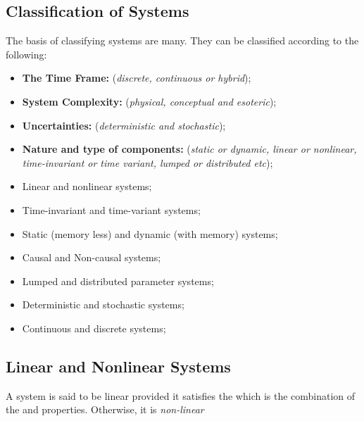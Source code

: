 \documentclass[../notes-main.tex]{subfiles}
\begin{document}
\subsection{Classification of Systems}
The basis of classifying systems are many. They can be classified according to the following:
\begin{mdframed}
    \begin{itemize}
        \item[\bluetext{a.}] \textbf{The Time Frame:} (\emph{discrete, continuous or hybrid});
        \item[\bluetext{b.}] \textbf{System Complexity:} (\emph{physical, conceptual and esoteric});
        \item[\bluetext{c.}] \textbf{Uncertainties:} (\emph{deterministic and stochastic});
        \item[\bluetext{d.}] \textbf{Nature and type of components:} (\emph{static or dynamic, linear or nonlinear, time-invariant or time variant, lumped or distributed etc});
    \end{itemize}
    \begin{itemize}
        \item Linear and nonlinear systems;
        \item Time-invariant and time-variant systems;
        \item Static (memory less) and dynamic (with memory) systems;
        \item Causal and Non-causal systems;
        \item Lumped and distributed parameter systems;
        \item Deterministic and stochastic systems;
        \item Continuous and discrete systems;
    \end{itemize}
\end{mdframed}\label{fig:system-type-list-md}
\newpage
\subsection{Linear and Nonlinear Systems}
\begin{mdframed}
    \begin{center}
        A system is said to be linear provided it satisfies the  which is the combination of the  and  properties. Otherwise, it is \emph{non-linear}
    \end{center}
\end{mdframed}\label{fig:linear-nonlinear-system-def-md}
\end{document}

